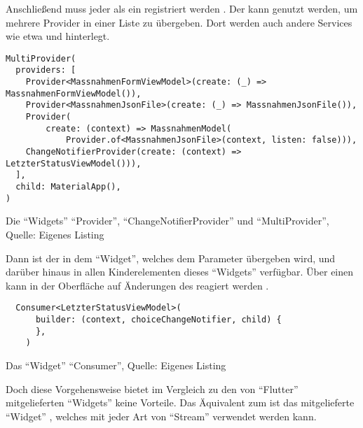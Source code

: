 Anschließend muss jeder  als ein  registriert werden . 
Der  kann genutzt werden, um mehrere Provider in einer Liste zu übergeben.
Dort werden auch andere Services wie etwa   und   hinterlegt.

\ifIncludeFigures
  \begin{listing}[h]
    \begin{verbatim}
MultiProvider(
  providers: [
    Provider<MassnahmenFormViewModel>(create: (_) => MassnahmenFormViewModel()),
    Provider<MassnahmenJsonFile>(create: (_) => MassnahmenJsonFile()),
    Provider(
        create: (context) => MassnahmenModel(
            Provider.of<MassnahmenJsonFile>(context, listen: false))),
    ChangeNotifierProvider(create: (context) => LetzterStatusViewModel())),
  ],
  child: MaterialApp(),
)
\end{verbatim}
    \caption[Die \enquote{Widgets} \enquote{Provider}, \enquote{ChangeNotifierProvider} und \enquote{MultiProvider}]{Die \enquote{Widgets} \enquote{Provider}, \enquote{ChangeNotifierProvider} und \enquote{MultiProvider}, Quelle: Eigenes Listing}
    \label{lst:MultiProvider}
  \end{listing}
\fi

Dann ist der  in dem \enquote{Widget}, welches dem Parameter  übergeben wird, und darüber hinaus in allen Kinderelementen dieses \enquote{Widgets} verfügbar.
Über einen  kann in der Oberfläche auf Änderungen des  reagiert werden \Lst{\ref{lst:Consumer}}.

\ifIncludeFigures
  \begin{listing}[h]
    \begin{verbatim}
  Consumer<LetzterStatusViewModel>(
      builder: (context, choiceChangeNotifier, child) {
      },
    )
\end{verbatim}
    \caption[Das \enquote{Widget} \enquote{Consumer}]{Das \enquote{Widget} \enquote{Consumer}, Quelle: Eigenes Listing}
    \label{lst:Consumer}
  \end{listing}
\fi


Doch diese Vorgehensweise bietet im Vergleich zu den von \enquote{Flutter} mitgelieferten \enquote{Widgets} keine Vorteile.
Das Äquivalent zum  ist das mitgelieferte \enquote{Widget} ,
welches mit jeder Art von \enquote{Stream} verwendet werden kann.

